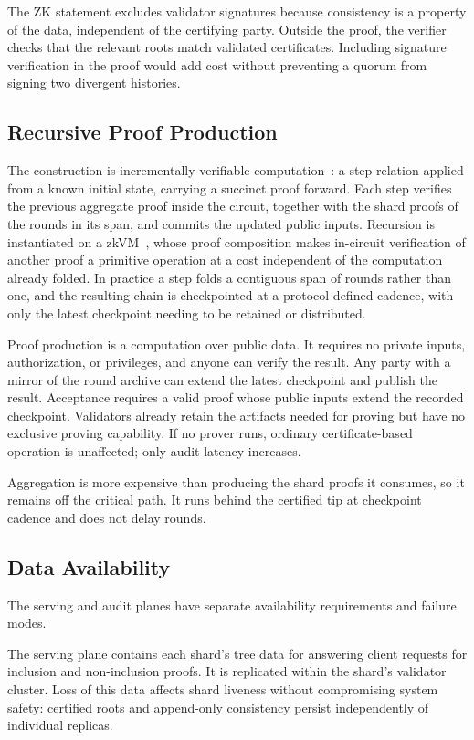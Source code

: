 The ZK statement excludes validator signatures because consistency is a property of the data, independent of the certifying party. Outside the proof, the verifier checks that the relevant roots match validated certificates. Including signature verification in the proof would add cost without preventing a quorum from signing two divergent histories.

\subsection{Recursive Proof Production}

The construction is incrementally verifiable computation~\cite{valiant2008}: a step relation applied from a known initial state, carrying a succinct proof forward. Each step verifies the previous aggregate proof inside the circuit, together with the shard proofs of the rounds in its span, and commits the updated public inputs. Recursion is instantiated on a zkVM~\cite{sp1}, whose proof composition makes in-circuit verification of another proof a primitive operation at a cost independent of the computation already folded. In practice a step folds a contiguous span of rounds rather than one, and the resulting chain is checkpointed at a protocol-defined cadence, with only the latest checkpoint needing to be retained or distributed.

Proof production is a computation over public data. It requires no private inputs, authorization, or privileges, and anyone can verify the result. Any party with a mirror of the round archive can extend the latest checkpoint and publish the result. Acceptance requires a valid proof whose public inputs extend the recorded checkpoint. Validators already retain the artifacts needed for proving but have no exclusive proving capability. If no prover runs, ordinary certificate-based operation is unaffected; only audit latency increases.

Aggregation is more expensive than producing the shard proofs it consumes, so it remains off the critical path. It runs behind the certified tip at checkpoint cadence and does not delay rounds.

\subsection{Data Availability}

The serving and audit planes have separate availability requirements and failure modes.

The serving plane contains each shard's tree data for answering client requests for inclusion and non-inclusion proofs. It is replicated within the shard's validator cluster. Loss of this data affects shard liveness without compromising system safety: certified roots and append-only consistency persist independently of individual replicas.

